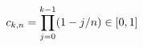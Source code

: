 \documentclass[preview]{standalone}
\begin{document}
\begin{align*}
\special{dvisvgm:raw <g id='unique000'>}c_{k,n}=\prod_{j=0}^{k-1}(1-j/n)\in[0,1]\special{dvisvgm:raw </g>}
\end{align*}
\end{document}
